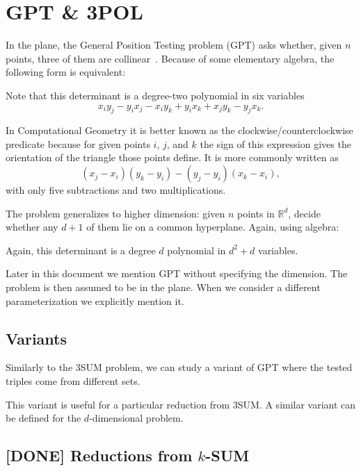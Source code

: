 \section{GPT \& 3POL}\label{sec:problem:pol}

In the plane, the General Position Testing problem (GPT) asks whether, given
\(n\) points, three of them are collinear~\cite{???}.
%
Because of some elementary algebra, the following form is equivalent:
%


Note that this determinant is a degree-two polynomial in six variables
\begin{displaymath}
	x_i y_j - y_i x_j - x_i y_k + y_i x_k + x_j y_k - y_j x_k.
\end{displaymath}

In Computational Geometry it is better known as the clockwise/counterclockwise
predicate because for given points \(i\), \(j\), and \(k\) the sign of this
expression gives the orientation of the triangle those points define.
%
It is more commonly written as
\begin{displaymath}
	(x_j - x_i)(y_k - y_i) - (y_j - y_i)(x_k - x_i),
\end{displaymath}
with only five subtractions and two multiplications.

The problem generalizes to higher dimension: given \(n\) points in
\(\mathbb{R}^d\), decide whether any \(d+1\) of them lie on a common
hyperplane. Again, using algebra:
%


Again, this determinant is a degree \(d\) polynomial in
\(d^2 + d\) variables.

Later in this document we mention GPT without specifying the dimension.
The problem is then assumed to be in the plane.
When we consider a different parameterization we explicitly mention it.

\subsection{Variants}

Similarly to the 3SUM problem, we can study a
variant of GPT where the tested triples come from different sets.
%


This variant is useful for a particular reduction from 3SUM.
A similar variant can be defined for the \(d\)-dimensional problem.

\subsection{[DONE] Reductions from \(k\)-SUM}

